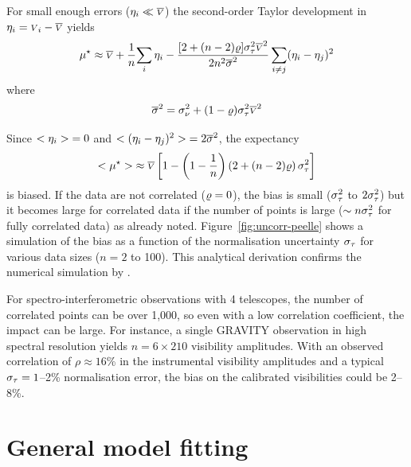 \documentclass{pasa}
\begin{document}
For small enough errors ($\eta_i \ll \overline{{\scriptstyle V}}$) the second-order Taylor development in $\eta_i = {\scriptstyle V}_i - \overline{{\scriptstyle V}}$ yields 
\begin{equation}
    \mu^\star \approx  \overline{{\scriptstyle V}} 
                  +\frac1n {\sum\limits_i \eta_i}
                       - \frac {[2 + (n - 2)\varrho]\sigma_\tau^2\overline{{\scriptstyle V}}^2
                          }{
                           2n^2 \overline{\sigma}^2             
                          }
                           \sum\limits_{i\ne j} (\eta_i-\eta_j)^2
\end{equation}
where
\begin{equation}
    \overline{\sigma}^2 = \sigma_\nu^2+(1-\varrho)\sigma_\tau^2\overline{{\scriptstyle V}}^2 
\end{equation}

Since $ {<\eta_i>}  = 0$ and $ {<(\eta_i-\eta_j)^2>}  = 2\overline{\sigma}^2$, the expectancy
\begin{equation}
     {<\ensuremath{\mu}^\star>}  \approx \overline{{\scriptstyle V}} 
            \left[ 1 -  
             \left(1-\frac1n\right)
             \left(2 + (n-2)\varrho\right)
              \sigma_\tau^2 \right]
\end{equation}
is biased.  If the data are not correlated ($\varrho = 0$), the bias is small
($\sigma_\tau^2$ to $2\sigma_\tau^2$) but it becomes large for correlated data if the number of points is large ($\sim n\sigma_\tau^2$ for fully correlated data) as \citet{DAG94} already noted. Figure~\ref{fig:uncorr-peelle} shows a simulation of the bias as a function of the normalisation uncertainty $\sigma_\tau$ for various data sizes ($n = 2$ to 100). This analytical derivation confirms the numerical simulation by \citet[][see their Fig.~4]{NEU12}. 

For spectro-interferometric observations with 4 telescopes, the number of correlated points can be over 1,000, so even with a low correlation coefficient, the impact can be large. For instance, a single GRAVITY observation in high spectral resolution yields $n = 6 \times 210$ visibility amplitudes. With an observed correlation of $\rho \approx 16$\% in the instrumental visibility amplitudes \citep{KAM20} and a typical $\sigma_\tau = 1$--2\% normalisation error, the bias on the calibrated visibilities could be 2--8\%.  

\section{General model fitting}
\label{sec:model}
\end{document}
